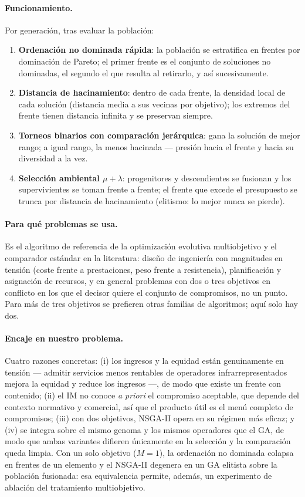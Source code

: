 \documentclass[11pt,a4paper]{article}
\begin{document}
\paragraph{Funcionamiento.} Por generación, tras evaluar la población:

\begin{enumerate}
\item \textbf{Ordenación no dominada rápida}: la población se estratifica
en frentes por dominación de Pareto; el primer frente es el conjunto de
soluciones no dominadas, el segundo el que resulta al retirarlo, y así
sucesivamente.
\item \textbf{Distancia de hacinamiento}: dentro de cada frente, la
densidad local de cada solución (distancia media a sus vecinas por
objetivo); los extremos del frente tienen distancia infinita y se
preservan siempre.
\item \textbf{Torneos binarios con comparación jerárquica}: gana la
solución de mejor rango; a igual rango, la menos hacinada --- presión
hacia el frente y hacia su diversidad a la vez.
\item \textbf{Selección ambiental $\mu+\lambda$}: progenitores y
descendientes se fusionan y los supervivientes se toman frente a frente;
el frente que excede el presupuesto se trunca por distancia de
hacinamiento (elitismo: lo mejor nunca se pierde).
\end{enumerate}

\paragraph{Para qué problemas se usa.} Es el algoritmo de referencia de la
optimización evolutiva multiobjetivo y el comparador estándar en la
literatura: diseño de ingeniería con magnitudes en tensión (coste frente a
prestaciones, peso frente a resistencia), planificación y asignación de
recursos, y en general problemas con dos o tres objetivos en conflicto en
los que el decisor quiere el conjunto de compromisos, no un punto. Para más
de tres objetivos se prefieren otras familias de algoritmos; aquí solo hay
dos.

\paragraph{Encaje en nuestro problema.} Cuatro razones concretas: (i) los
ingresos y la equidad están genuinamente en tensión --- admitir servicios
menos rentables de operadores infrarrepresentados mejora la equidad y
reduce los ingresos ---, de modo que existe un frente con contenido;
(ii) el IM no conoce \emph{a priori} el compromiso aceptable, que depende
del contexto normativo y comercial, así que el producto útil es el menú
completo de compromisos; (iii) con dos objetivos, NSGA-II opera en su
régimen más eficaz; y (iv) se integra sobre el mismo genoma y los mismos
operadores que el GA, de modo que ambas variantes difieren únicamente en la
selección y la comparación queda limpia. Con un solo objetivo ($M{=}1$), la
ordenación no dominada colapsa en frentes de un elemento y el NSGA-II
degenera en un GA elitista sobre la población fusionada: esa equivalencia
permite, además, un experimento de ablación del tratamiento multiobjetivo.
\end{document}
